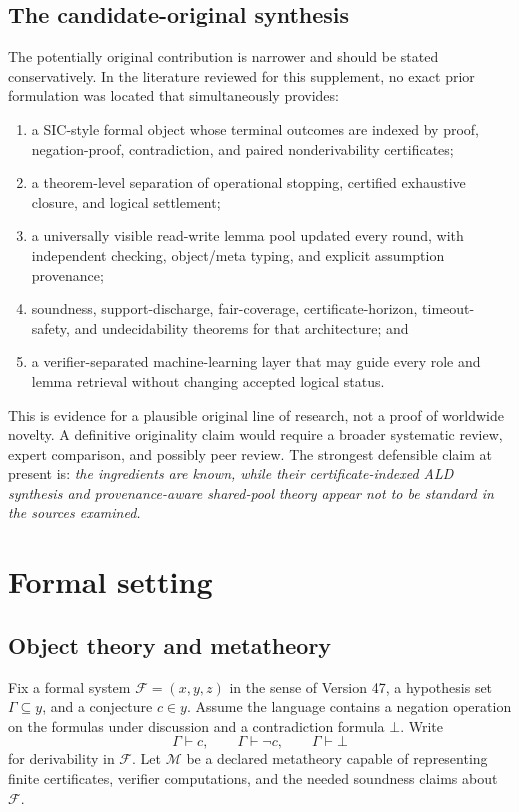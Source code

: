 \documentclass[11pt]{article}
\theoremstyle{definition}
\theoremstyle{remark}
\newcommand{\M}{\mathcal M}
\newcommand{\F}{\mathcal F}
\newcommand{\Gammaa}{\Gamma}
\newcommand{\bottomf}{\bot}
\begin{document}
\subsection{The candidate-original synthesis}
The potentially original contribution is narrower and should be stated conservatively. In the literature reviewed for this supplement, no exact prior formulation was located that simultaneously provides:
\begin{enumerate}[label=(\roman*)]
  \item a SIC-style formal object whose terminal outcomes are indexed by proof, negation-proof, contradiction, and paired nonderivability certificates;
  \item a theorem-level separation of operational stopping, certified exhaustive closure, and logical settlement;
  \item a universally visible read-write lemma pool updated every round, with independent checking, object/meta typing, and explicit assumption provenance;
  \item soundness, support-discharge, fair-coverage, certificate-horizon, timeout-safety, and undecidability theorems for that architecture; and
  \item a verifier-separated machine-learning layer that may guide every role and lemma retrieval without changing accepted logical status.
\end{enumerate}
This is evidence for a plausible original line of research, not a proof of worldwide novelty. A definitive originality claim would require a broader systematic review, expert comparison, and possibly peer review. The strongest defensible claim at present is: \emph{the ingredients are known, while their certificate-indexed ALD synthesis and provenance-aware shared-pool theory appear not to be standard in the sources examined.}

\section{Formal setting}

\subsection{Object theory and metatheory}
Fix a formal system $\F=(x,y,z)$ in the sense of Version 47, a hypothesis set $\Gammaa\subseteq y$, and a conjecture $c\in y$. Assume the language contains a negation operation on the formulas under discussion and a contradiction formula $\bottomf$. Write
\[
\Gammaa\vdash c,\qquad \Gammaa\vdash\neg c,\qquad \Gammaa\vdash\bottomf
\]
for derivability in $\F$. Let $\M$ be a declared metatheory capable of representing finite certificates, verifier computations, and the needed soundness claims about $\F$.
\end{document}
